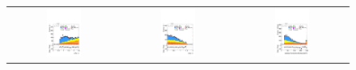 \begin{figure}[htbp]
  \centering
  \setlength{\tabcolsep}{1.5pt}
  \renewcommand{\arraystretch}{0}

  \begin{tabular}{@{}c c c@{}}
    \includegraphics[width=0.33\textwidth]{images/plots_modelling_run2_run3_variables/run_3_tth/plot_ditau_dr_hh_tth_22_23_24.pdf} &
    \includegraphics[width=0.33\textwidth]{images/plots_modelling_run2_run3_variables/run_3_tth/plot_ditau_deta_hh_tth_22_23_24.pdf} &
    \includegraphics[width=0.33\textwidth]{images/plots_modelling_run2_run3_variables/run_3_tth/plot_met_reco_et_hh_tth_22_23_24.pdf} \\[4pt]

\end{tabular}
\end{figure}
